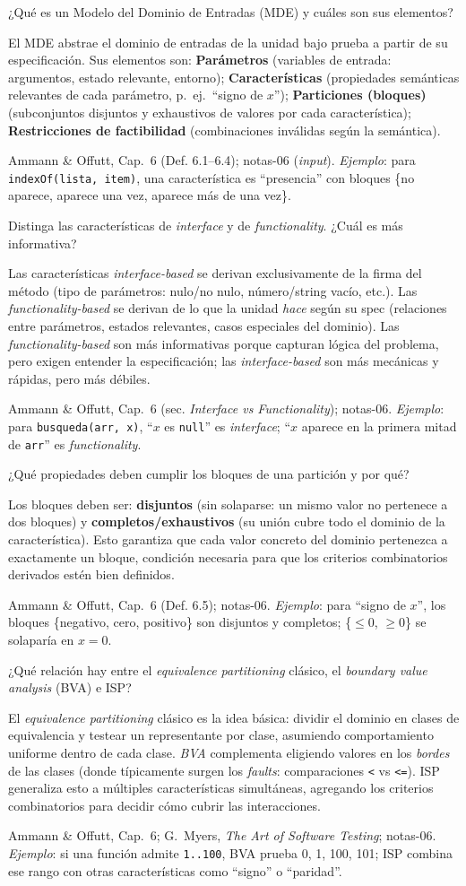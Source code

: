 \documentclass[11pt,a4paper]{article}
\newcounter{preg}
\newcommand{\qa}[3]{%
  \stepcounter{preg}%
  \vspace{0.4em}
  \begin{preguntabox}{\thepreg}
  #1
  \end{preguntabox}
  \begin{respuestabox}
  #2
  \end{respuestabox}
  \begin{refbox}
  #3
  \end{refbox}
  \vspace{0.6em}
}
\begin{document}
\qa{¿Qué es un Modelo del Dominio de Entradas (MDE) y cuáles son sus elementos?}
{El MDE abstrae el dominio de entradas de la unidad bajo prueba a partir de su especificación. Sus elementos son: \textbf{Parámetros} (variables de entrada: argumentos, estado relevante, entorno); \textbf{Características} (propiedades semánticas relevantes de cada parámetro, p.~ej.\ ``signo de $x$''); \textbf{Particiones (bloques)} (subconjuntos disjuntos y exhaustivos de valores por cada característica); \textbf{Restricciones de factibilidad} (combinaciones inválidas según la semántica).}
{Ammann \& Offutt, Cap.~6 (Def. 6.1--6.4); notas-06 (\emph{input}). \emph{Ejemplo}: para \texttt{indexOf(lista, item)}, una característica es ``presencia'' con bloques \{no aparece, aparece una vez, aparece más de una vez\}.}

\qa{Distinga las características de \emph{interface} y de \emph{functionality}. ¿Cuál es más informativa?}
{Las características \emph{interface-based} se derivan exclusivamente de la firma del método (tipo de parámetros: nulo/no nulo, número/string vacío, etc.). Las \emph{functionality-based} se derivan de lo que la unidad \emph{hace} según su spec (relaciones entre parámetros, estados relevantes, casos especiales del dominio). Las \emph{functionality-based} son más informativas porque capturan lógica del problema, pero exigen entender la especificación; las \emph{interface-based} son más mecánicas y rápidas, pero más débiles.}
{Ammann \& Offutt, Cap.~6 (sec. \emph{Interface vs Functionality}); notas-06. \emph{Ejemplo}: para \texttt{busqueda(arr, x)}, ``$x$ es \texttt{null}'' es \emph{interface}; ``$x$ aparece en la primera mitad de \texttt{arr}'' es \emph{functionality}.}

\qa{¿Qué propiedades deben cumplir los bloques de una partición y por qué?}
{Los bloques deben ser: \textbf{disjuntos} (sin solaparse: un mismo valor no pertenece a dos bloques) y \textbf{completos/exhaustivos} (su unión cubre todo el dominio de la característica). Esto garantiza que cada valor concreto del dominio pertenezca a exactamente un bloque, condición necesaria para que los criterios combinatorios derivados estén bien definidos.}
{Ammann \& Offutt, Cap.~6 (Def. 6.5); notas-06. \emph{Ejemplo}: para ``signo de $x$'', los bloques \{negativo, cero, positivo\} son disjuntos y completos; \{$\leq 0$, $\geq 0$\} se solaparía en $x=0$.}

\qa{¿Qué relación hay entre el \emph{equivalence partitioning} clásico, el \emph{boundary value analysis} (BVA) e ISP?}
{El \emph{equivalence partitioning} clásico es la idea básica: dividir el dominio en clases de equivalencia y testear un representante por clase, asumiendo comportamiento uniforme dentro de cada clase. \emph{BVA} complementa eligiendo valores en los \emph{bordes} de las clases (donde típicamente surgen los \emph{faults}: comparaciones \texttt{<} vs \texttt{<=}). ISP generaliza esto a múltiples características simultáneas, agregando los criterios combinatorios para decidir cómo cubrir las interacciones.}
{Ammann \& Offutt, Cap.~6; G.~Myers, \emph{The Art of Software Testing}; notas-06. \emph{Ejemplo}: si una función admite \texttt{1..100}, BVA prueba 0, 1, 100, 101; ISP combina ese rango con otras características como ``signo'' o ``paridad''.}
\end{document}

